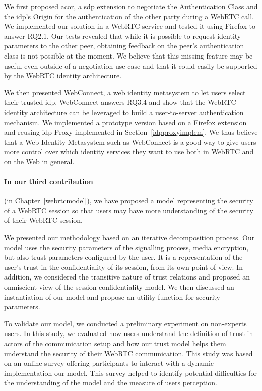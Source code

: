 We first proposed \gls{acor}, a \gls{sdp} extension to negotiate the Authentication Class and the \gls{idp}'s Origin for the authentication of the other party during a WebRTC call.
We implemented our solution in a WebRTC service and tested it using Firefox to answer RQ2.1.
Our tests revealed that while it is possible to request identity parameters to the other peer, obtaining feedback on the peer's authentication class is not possible at the moment.
We believe that this missing feature may be useful even outside of a negotiation use case and that it could easily be supported by the WebRTC identity architecture.

We then presented WebConnect, a web identity metasystem to let users select their trusted \gls{idp}.
WebConnect answers RQ3.4 and show that the WebRTC identity architecture can be leveraged to build a user-to-server authentication mechanism.
We implemented a prototype version based on a Firefox extension and reusing \gls{idp} Proxy implemented in Section~\ref{idpproxyimplem}.
We thus believe that a Web Identity Metasystem such as WebConnect is a good way to give users more control over which identity services they want to use both in WebRTC and on the Web in general.

\paragraph{In our third contribution} (in Chapter~\ref{webrtcmodel}), we have proposed a model representing the security of a WebRTC session so that users may have more understanding of the security of their WebRTC session.

We presented our methodology based on an iterative decomposition process.
Our model uses the security parameters of the signalling process, media encryption, but also trust parameters configured by the user.
It is a representation of the user's trust in the confidentiality of its session, from its own point-of-view.
In addition, we considered the transitive nature of trust relations and proposed an omniscient view of the session confidentiality model.
We then discussed an instantiation of our model and propose an utility function for security parameters.

To validate our model, we conducted a preliminary experiment on non-experts users.
In this study, we evaluated how users understand the definition of trust in actors of the communication setup and how our trust model helps them understand the security of their WebRTC communication. 
This study was based on an online survey offering participants to interact with a dynamic implementation our model.
This survey helped to identify potential difficulties for the understanding of the model and the measure of users perception.


